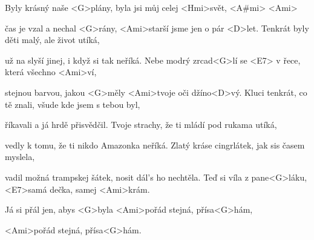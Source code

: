 
\zs
Byly krásný naše <G>plány,
byla jsi můj celej <Hmi>svět, <A#mi> <Ami>

čas je vzal a nechal <G>rány,
<Ami>starší jsme jen o pár <D>let.
\ks
\zs
Tenkrát byly děti malý, ale život utíká,

už na  slyší jinej, i když si tak neříká.
\ks
\zr
Nebe modrý zrcad<G>lí se <E7> v řece, která všechno <Ami>ví,

stejnou barvou, jakou <G>měly <Ami>tvoje oči džíno<D>vý.
\kr
\zs
Kluci tenkrát, co tě znali, všude kde jsem s tebou byl,

 říkavali a já hrdě přisvědčil.
\ks
\zs
Tvoje strachy, že ti mládí pod rukama utíká,

vedly k tomu, že ti nikdo Amazonka neříká.
\ks
\zr \kr
\zs
Zlatý kráse cingrlátek,
jak sis časem myslela,

vadil možná trampskej šátek,
nosit dál's ho nechtěla.
\ks
\zs
Teď si víla z pane<G>láku, <E7>samá dečka, samej <Ami>krám.

Já si přál jen, abys <G>byla <Ami>pořád stejná, přísa<G>hám,

<Ami>pořád stejná, přísa<G>hám.
\ks
\zr \kr
\kp







